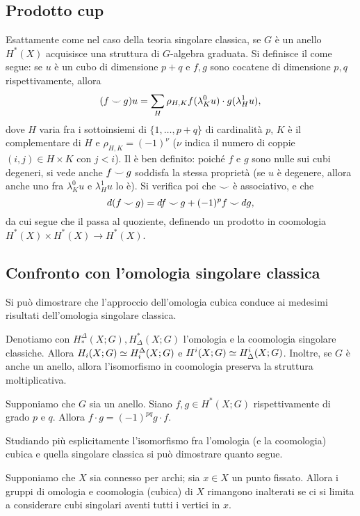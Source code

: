 \subsection{Prodotto cup}\label{cubic-homology:cup-product}
Esattamente come nel caso della teoria singolare classica, se $G$ è un anello $H^*(X)$ acquisisce una struttura di $G$-algebra graduata. Si definisce il \cupproduct{} come segue: se $u$ è un cubo di dimensione $p+q$ e $f,g$ sono cocatene di dimensione $p,q$ rispettivamente, allora
$$
(f\mathbin{\smile} g)u=\sum_H\rho_{H,K}f(\lambda^0_Ku)\cdot g(\lambda^1_Hu),
$$
dove $H$ varia fra i sottoinsiemi di $\{1,\ldots,p+q\}$ di cardinalità $p$, $K$ è il complementare di $H$ e $\rho_{H,K}=(-1)^\nu$ ($\nu$ indica il numero di coppie $(i,j)\in H\times K$ con $j<i$). Il \cupproduct{} è ben definito: poiché $f$ e $g$ sono nulle sui cubi degeneri, si vede anche $f\mathbin{\smile} g$ soddisfa la stessa proprietà (se $u$ è degenere, allora anche uno fra $\lambda^0_Ku$ e $\lambda^1_Hu$ lo è). Si verifica poi che $\mathbin{\smile}$ è associativo, e che
$$
d(f\mathbin{\smile} g)=df\mathbin{\smile} g+(-1)^pf\mathbin{\smile} dg,
$$
da cui segue che il \cupproduct{} passa al quoziente, definendo un prodotto in coomologia $H^*(X)\times H^*(X)\to H^*(X)$.

\subsection{Confronto con l'omologia singolare classica}\label{cubic-homology:comparison}
Si può dimostrare che l'approccio dell'omologia cubica conduce ai medesimi risultati dell'omologia singolare classica.

\begin{proposition}
Denotiamo con $H_*^\Delta(X;G),H^*_\Delta(X;G)$ l'omologia e la coomologia singolare classiche. Allora $H_i(X;G)\simeq H_i^\Delta(X;G)$ e $H^i(X;G)\simeq H_\Delta^i(X;G)$. Inoltre, se $G$ è anche un anello, allora l'isomorfismo in coomologia preserva la struttura moltiplicativa.
\end{proposition}
\begin{corollary}
Supponiamo che $G$ sia un anello. Siano $f,g\in H^*(X;G)$ rispettivamente di grado $p$ e $q$. Allora $f\cdot g=(-1)^{pq}g\cdot f$.
\end{corollary}
Studiando più esplicitamente l'isomorfismo fra l'omologia (e la coomologia) cubica e quella singolare classica si può dimostrare quanto segue.
\begin{proposition}
Supponiamo che $X$ sia connesso per archi; sia $x\in X$ un punto fissato. Allora i gruppi di omologia e coomologia (cubica)  di $X$ rimangono inalterati se ci si limita a considerare cubi singolari aventi tutti i vertici in $x$.
\end{proposition}


